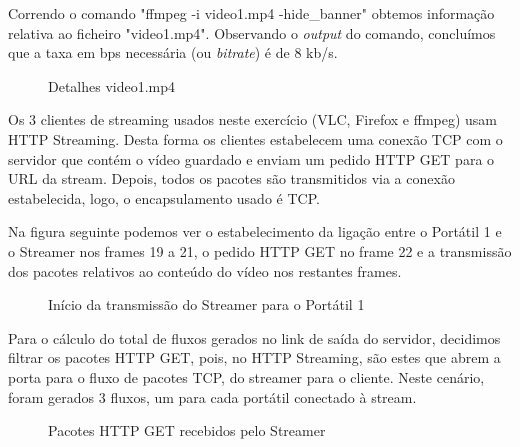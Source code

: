 \documentclass[a4paper, 11pt]{article}
\begin{document}
Correndo o comando "ffmpeg -i video1.mp4 -hide\_banner" obtemos informação relativa ao ficheiro "video1.mp4". Observando o \textit{output} do comando, concluímos que a taxa em bps necessária (ou \textit{bitrate}) é de 8 kb/s.

\begin{figure}[H]
    \centering
    \caption{Detalhes video1.mp4}
\end{figure}

Os 3 clientes de streaming usados neste exercício (VLC, Firefox e ffmpeg) usam HTTP Streaming. Desta forma os clientes estabelecem uma conexão TCP com o servidor que contém o vídeo guardado e enviam um pedido HTTP GET para o URL da stream. Depois, todos os pacotes são transmitidos via a conexão estabelecida, logo, o encapsulamento usado é TCP. \cite{livro}

Na figura seguinte podemos ver o estabelecimento da ligação entre o Portátil 1 e o Streamer nos frames 19 a 21, o pedido HTTP GET no frame 22 e a transmissão dos pacotes relativos ao conteúdo do vídeo nos restantes frames.

\begin{figure}[H]
    \centering
    \caption{Início da transmissão do Streamer para o Portátil 1}
\end{figure}

Para o cálculo do total de fluxos gerados no link de saída do servidor, decidimos filtrar os pacotes HTTP GET, pois, no HTTP Streaming, são estes que abrem a porta para o fluxo de pacotes TCP, do streamer para o cliente. Neste cenário, foram gerados 3 fluxos, um para cada portátil conectado à stream.

\begin{figure}[H]
    \centering
    \caption{Pacotes HTTP GET recebidos pelo Streamer}
\end{figure}
\end{document}
